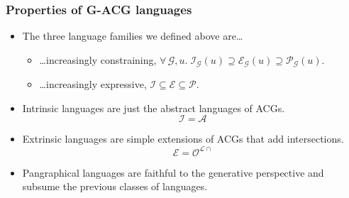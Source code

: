 \documentclass{beamer}
\begin{document}
\begin{frame}
  \frametitle{Properties of G-ACG languages}

  \begin{itemize}
  \item The three language families we defined above are\ldots
    \begin{itemize}
    \item {\ldots}increasingly constraining, $\forall \, \mathcal{G},
      u. \; \mathcal{I}_{\mathcal{G}}(u) \supseteq
      \mathcal{E}_{\mathcal{G}}(u) \supseteq
      \mathcal{P}_{\mathcal{G}}(u)$.
    \item {\ldots}increasingly expressive, $\mathcal{I} \subseteq
      \mathcal{E} \subseteq \mathcal{P}$.
    \end{itemize}
  \vfill
  \item Intrinsic languages are just the abstract languages of ACGs.
    $$\mathcal{I} = \mathcal{A}$$
  \vfill
  \item Extrinsic languages are simple extensions of ACGs that add
    intersections.
    $$\mathcal{E} = \mathcal{O}^{\mathcal{L}{\cap}}$$
  \vfill
  \item Pangraphical languages are faithful to the generative
    perspective and subsume the previous classes of languages.
  \end{itemize}
\end{frame}
\end{document}
